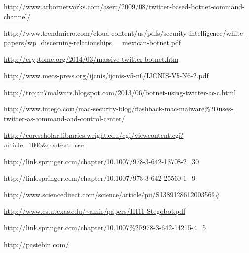 \documentclass[11pt, oneside]{article} %
\numberwithin{equation}{section} %
\numberwithin{figure}{section} %
\numberwithin{table}{section} %
\begin{document}
\begingroup
\renewcommand{\section}[2]{}%
\begin{thebibliography}{99}

	\url{http://www.arbornetworks.com/asert/2009/08/twitter-based-botnet-command-channel/}

	\url{http://www.trendmicro.com/cloud-content/us/pdfs/security-intelligence/white-papers/wp_discerning-relationships__mexican-botnet.pdf}

	\url{http://cryptome.org/2014/03/massive-twitter-botnet.htm}

	\url{http://www.mecs-press.org/ijcnis/ijcnis-v5-n6/IJCNIS-V5-N6-2.pdf}

	\url{http://trojan7malware.blogspot.com/2013/06/botnet-using-twitter-as-c.html}

	\url{http://www.intego.com/mac-security-blog/flashback-mac-malware\%2Duses-twitter-as-command-and-control-center/}

	\url{http://corescholar.libraries.wright.edu/cgi/viewcontent.cgi?article=1006&context=cse}

	\url{http://link.springer.com/chapter/10.1007/978-3-642-13708-2_30}

	\url{http://link.springer.com/chapter/10.1007/978-3-642-25560-1_9}

	\url{http://www.sciencedirect.com/science/article/pii/S1389128612003568#}

	\url{http://www.cs.utexas.edu/~amir/papers/IH11-Stegobot.pdf}

	\url{http://link.springer.com/chapter/10.1007\%2F978-3-642-14215-4_5}

	\url{http://pastebin.com/}

\end{thebibliography}

\endgroup
\end{document}
